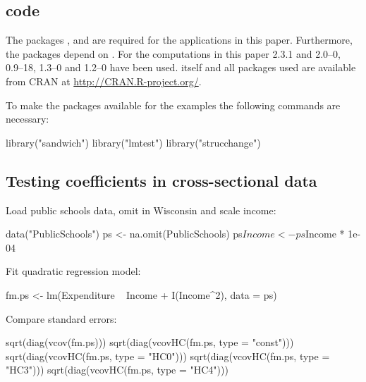 \documentclass{Z}
\begin{document}
\begin{appendix}


\section[R code]{ code}

The packages ,  and  are
required for the applications in this paper. Furthermore, the packages
depend on . For the computations in this paper 
2.3.1 and 
2.0--0,
 0.9--18,
 1.3--0
and  1.2--0
have been used.  itself and all packages used are available from
CRAN at \url{http://CRAN.R-project.org/}.

To make the packages available for the examples the following commands are 
necessary:
\begin{Schunk}
\begin{Sinput}
  library("sandwich")
  library("lmtest")
  library("strucchange")
\end{Sinput}
\end{Schunk}

\subsection{Testing coefficients in cross-sectional data}

Load public schools data,
omit  in Wisconsin and scale income:
\begin{Schunk}
\begin{Sinput}
  data("PublicSchools")
  ps <- na.omit(PublicSchools)
  ps$Income <- ps$Income * 1e-04
\end{Sinput}
\end{Schunk}

Fit quadratic regression model:
\begin{Schunk}
\begin{Sinput}
  fm.ps <- lm(Expenditure ~ Income + I(Income^2), data = ps)
\end{Sinput}
\end{Schunk}

Compare standard errors:
\begin{Schunk}
\begin{Sinput}
  sqrt(diag(vcov(fm.ps)))
  sqrt(diag(vcovHC(fm.ps, type = "const")))
  sqrt(diag(vcovHC(fm.ps, type = "HC0")))
  sqrt(diag(vcovHC(fm.ps, type = "HC3")))
  sqrt(diag(vcovHC(fm.ps, type = "HC4")))
\end{Sinput}
\end{Schunk}


\end{appendix}
\end{document}
